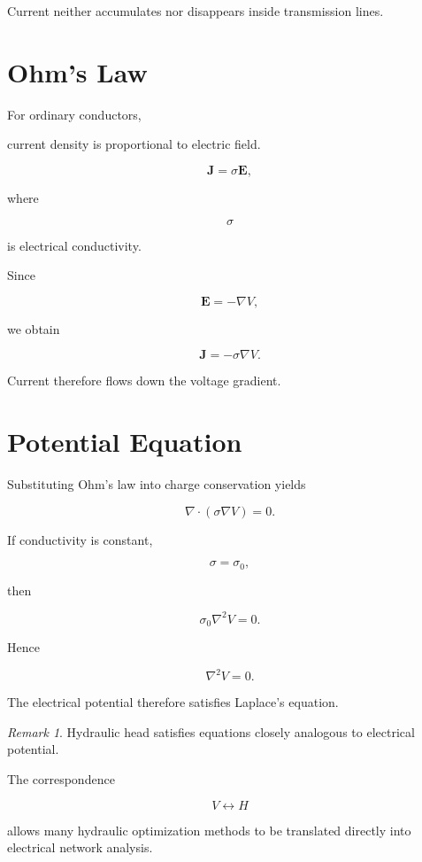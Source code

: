 \documentclass[11pt,fleqn]{book}
\numberwithin{equation}{chapter}
\theoremstyle{plain}
\theoremstyle{definition}
\theoremstyle{remark}
\newtheorem{remark}[theorem]{Remark}
\begin{document}
Current neither accumulates nor disappears inside transmission lines.


\section{Ohm's Law}

For ordinary conductors,

current density is proportional to electric field.

\[
\boxed{
\mathbf J
=
\sigma
\mathbf E,
}
\]

where

\[
\sigma
\]

is electrical conductivity.

Since

\[
\mathbf E
=
-\nabla V,
\]

we obtain

\[
\boxed{
\mathbf J
=
-
\sigma
\nabla V.
}
\]

Current therefore flows down the voltage gradient.


\section{Potential Equation}

Substituting Ohm's law into charge conservation yields

\[
\nabla\cdot
(
\sigma\nabla V
)
=
0.
\]

If conductivity is constant,

\[
\sigma=\sigma_0,
\]

then

\[
\sigma_0
\nabla^2V
=
0.
\]

Hence

\[
\boxed{
\nabla^2V=0.
}
\]

The electrical potential therefore satisfies Laplace's equation.


\begin{remark}

Hydraulic head satisfies equations closely analogous to electrical
potential.

The correspondence

\[
V
\longleftrightarrow
H
\]

allows many hydraulic optimization methods to be translated directly
into electrical network analysis.

\end{remark}
\end{document}

